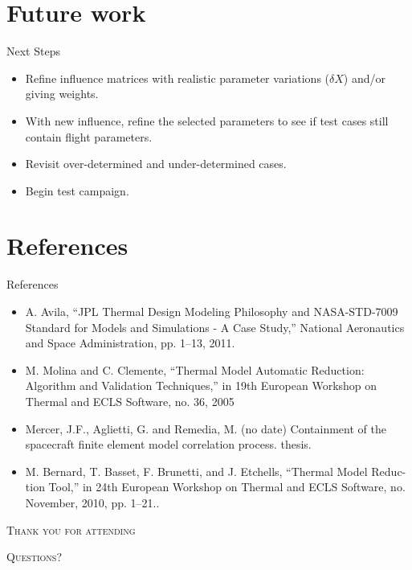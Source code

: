 \documentclass{cubeamer}
\begin{document}
\section{Future work}

\begin{frame}{Next Steps}
    \begin{itemize}
        \item Refine influence matrices with realistic parameter variations ($\delta X$) and/or giving weights.
        \item With new influence, refine the selected parameters to see if test cases still contain flight parameters.
        \item Revisit over-determined and under-determined cases.
        \item Begin test campaign.
    \end{itemize}
\end{frame}

\section{References}
\begin{frame}{References}
\begin{itemize}
\small
    \item A. Avila, “JPL Thermal Design Modeling Philosophy and NASA-STD-7009
Standard for Models and Simulations - A Case Study,” National Aeronautics
and Space Administration, pp. 1–13, 2011.
    \item M. Molina and C. Clemente, “Thermal Model Automatic Reduction: Algorithm
and Validation Techniques,” in 19th European Workshop on Thermal and ECLS
Software, no. 36, 2005
    \item Mercer, J.F., Aglietti, G. and Remedia, M. (no date) Containment of the spacecraft finite element model correlation process. thesis. 
    \item M. Bernard, T. Basset, F. Brunetti, and J. Etchells, “Thermal Model Reduc-
tion Tool,” in 24th European Workshop on Thermal and ECLS Software, no.
November, 2010, pp. 1–21..
\end{itemize}
\end{frame}

 

\begin{frame}[standout]
    \Huge\textsc{Thank you for attending}
    
    \vfill
    
    \LARGE\textsc{Questions?}
\end{frame}
\end{document}
